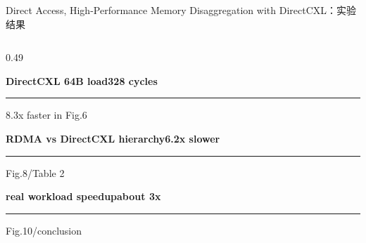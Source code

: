 \begin{frame}[t,shrink=6]{Direct Access, High-Performance Memory Disaggregation with DirectCXL：实验结果}
\begin{columns}[T,totalwidth=\textwidth]
\begin{column}{0.49\textwidth}
{\begin{minipage}[t]{0.97\linewidth}
\begin{minipage}{0.92\linewidth}
\textbf{DirectCXL 64B load}\hfill \textcolor{Accent}{\bfseries 328 cycles}\par\textcolor{Accent}{\rule{0.12\linewidth}{1.1mm}}\par{\tiny\textcolor{Muted}{8.3x faster in Fig.6}}\par\vspace{0.8mm}
\textbf{RDMA vs DirectCXL hierarchy}\hfill \textcolor{Accent}{\bfseries 6.2x slower}\par\textcolor{Accent}{\rule{0.62\linewidth}{1.1mm}}\par{\tiny\textcolor{Muted}{Fig.8/Table 2}}\par\vspace{0.8mm}
\textbf{real workload speedup}\hfill \textcolor{Accent}{\bfseries about 3x}\par\textcolor{Accent}{\rule{0.45\linewidth}{1.1mm}}\par{\tiny\textcolor{Muted}{Fig.10/conclusion}}\par\vspace{0.8mm}
    \end{minipage}
    \vspace{1mm}
  \end{minipage}}
  \end{column}
\end{columns}
\end{frame}


